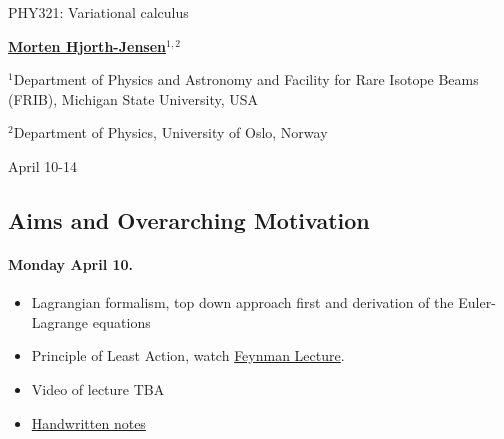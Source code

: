 \documentclass[%
oneside,                 %
final,                   %
10pt]{article}
\begin{document}

\newcommand{\exercisesection}[1]{\subsection*{#1}}






\thispagestyle{empty}

\begin{center}
{\LARGE\bf
\begin{spacing}{1.25}
PHY321: Variational calculus
\end{spacing}
}
\end{center}


\begin{center}
{\bf \href{{http://mhjgit.github.io/info/doc/web/}}{Morten Hjorth-Jensen}${}^{1, 2}$} \\ [0mm]
\end{center}

\begin{center}
\centerline{{\small ${}^1$Department of Physics and Astronomy and Facility for Rare Isotope Beams (FRIB), Michigan State University, USA}}
\centerline{{\small ${}^2$Department of Physics, University of Oslo, Norway}}
\end{center}
    

\begin{center}
April 10-14
\end{center}

\vspace{1cm}


\subsection{Aims and Overarching Motivation}

\paragraph{Monday April 10.}
\begin{itemize}
\item Lagrangian formalism, top down approach first and derivation of the Euler-Lagrange equations

\item Principle of Least Action, watch \href{{https://www.feynmanlectures.caltech.edu/II_19.html}}{Feynman Lecture}.

\item Video of lecture TBA

\item \href{{https://github.com/mhjensen/Physics321/blob/master/doc/HandWrittenNotes/Spring2023/NotesApril12.pdf}}{Handwritten notes}
\end{itemize}
\end{document}
